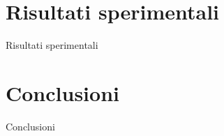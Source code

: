\documentclass{article}
\begin{document}
\section{Risultati sperimentali}
Risultati sperimentali


\section{Conclusioni}

Conclusioni

\end{document}
